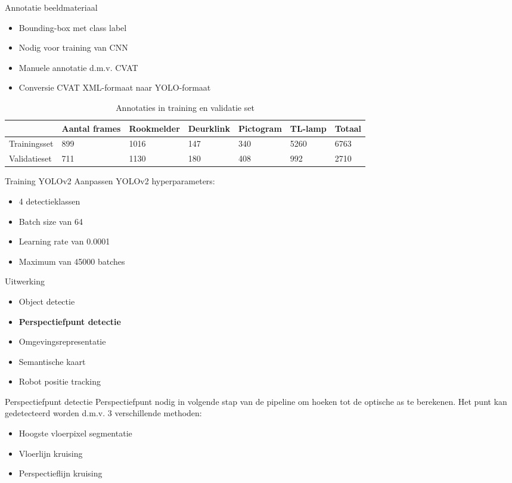\documentclass[11pt,t]{beamer}
\begin{document}
\begin{frame}{Annotatie beeldmateriaal}
	\begin{itemize}
		\item Bounding-box met class label
		\item Nodig voor training van CNN
		\item Manuele annotatie d.m.v. CVAT
		\item Conversie CVAT XML-formaat naar YOLO-formaat
	\end{itemize}

	\begin{table}
		\tiny
		\caption{Annotaties in training en validatie set}
		\begin{tabular}{l | l | l | l | l | l | l}
			& Aantal frames & Rookmelder & Deurklink & Pictogram & TL-lamp & Totaal \\ \hline
			Trainingsset & 899 & 1016 & 147 & 340 & 5260 & 6763 \\
			Validatieset & 711 & 1130 & 180 & 408 & 992 & 2710 \\
		\end{tabular}
	\end{table}
\end{frame}

\begin{frame}[fragile]{Training YOLOv2}
	Aanpassen YOLOv2 hyperparameters:
	\begin{itemize}
		\item 4 detectieklassen
		\item Batch size van 64
		\item Learning rate van 0.0001
		\item Maximum van 45000 batches
	\end{itemize}
\end{frame}

%
%
\begin{frame}[fragile]{Uitwerking}
	\begin{itemize}
		\item Object detectie
		\item \textbf{Perspectiefpunt detectie}
		\item Omgevingsrepresentatie
		\item Semantische kaart
		\item Robot positie tracking
	\end{itemize}
\end{frame}

\begin{frame}[fragile]{Perspectiefpunt detectie}
	Perspectiefpunt nodig in volgende stap van de pipeline om hoeken tot de optische as te berekenen. Het punt kan gedetecteerd worden d.m.v. 3 verschillende methoden:
	\begin{itemize}
		\item Hoogste vloerpixel segmentatie
		\item Vloerlijn kruising
		\item Perspectieflijn kruising
	\end{itemize}
\end{frame}
\end{document}
